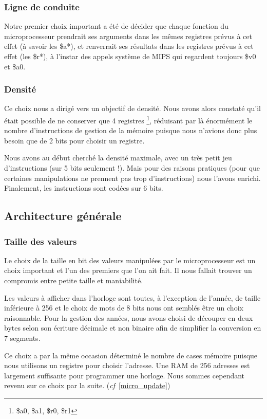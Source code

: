 \documentclass{article}
\begin{document}
\subsubsection{Ligne de conduite}
Notre premier choix important a été de décider que chaque fonction du
microprocesseur prendrait ses arguments dans les mêmes registres prévus à cet effet
(à savoir les \$a*), et renverrait ses résultats dans les registres prévus à
cet effet (les \$r*), à l'instar des appels système de MIPS qui regardent
toujours \$v0 et \$a0.

\subsubsection{Densité}
Ce choix nous a dirigé vers un objectif de densité. Nous avons alors constaté
qu'il était possible de ne conserver que 4 registres
\footnote{\$a0, \$a1, \$r0, \$r1}, réduisant par là énormément le nombre
d'instructions de gestion de la mémoire puisque nous n'avions donc  plus besoin
que de 2 bits pour choisir un registre.

Nous avons au début cherché la densité maximale, avec un très petit jeu
d'instructions (sur 5 bits seulement !).
Mais pour des raisons pratiques (pour que certaines manipulations ne prennent pas
trop d'instructions) nous l'avons enrichi. Finalement, les instructions sont
codées sur 6 bits.


\subsection{Architecture générale}

\subsubsection{Taille des valeurs}
Le choix de la taille en bit des valeurs manipulées par le microprocesseur est
un choix important et l'un des premiers que l'on ait fait. Il nous fallait trouver
un compromis entre petite taille et maniabilité.

Les valeurs à afficher dans l'horloge sont toutes, à l'exception de l'année, de
taille inférieure à 256 et le choix de mots de 8 bits nous ont semblés être un
choix raisonnable. Pour la gestion des années, nous avons choisi de découper en
deux bytes selon son écriture décimale et non binaire afin de simplifier la
conversion en 7 segments.

Ce choix a par la même occasion déterminé le nombre de cases mémoire puisque nous utilisons un registre pour choisir l'adresse. Une RAM de 256 adresses est largement suffisante pour programmer une horloge. Nous sommes cependant revenu sur ce choix par la suite. (\emph{cf}~\ref{micro_update})
\end{document}
